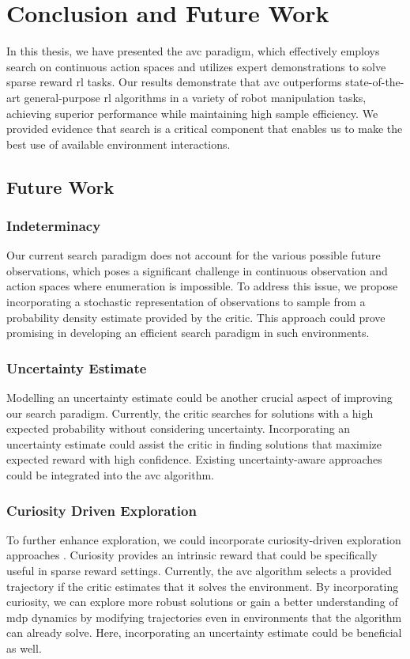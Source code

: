 
\chapter{Conclusion and Future Work}
\label{chapter:Conc_Fut}
In this thesis, we have presented the \ac{avc} paradigm, which effectively employs search on continuous action spaces and utilizes 
expert demonstrations to solve sparse reward \ac{rl} tasks. Our results demonstrate that \ac{avc} 
outperforms state-of-the-art general-purpose \ac{rl} algorithms in a variety of robot manipulation tasks, achieving superior performance 
while maintaining high sample efficiency. We provided evidence that search is a critical component that enables us to make the best use of available 
environment interactions.

\section{Future Work}
\subsection{Indeterminacy}
Our current search paradigm does not account for the various possible future observations, which poses a significant challenge in 
continuous observation and action spaces where enumeration is impossible. To address this issue, we propose incorporating a stochastic 
representation of observations to sample from a probability density estimate provided by the critic. 
This approach could prove promising in developing an efficient search paradigm in such environments.

\subsection{Uncertainty Estimate}
Modelling an uncertainty estimate could be another crucial aspect of improving our search paradigm. 
Currently, the critic searches for solutions with a high expected probability without considering uncertainty. 
Incorporating an uncertainty estimate could assist the critic in finding solutions that maximize expected reward with high confidence. 
Existing uncertainty-aware approaches \cite{gawlikowski2022survey,liu2022simple} 
could be integrated into the \ac{avc} algorithm.

\subsection{Curiosity Driven Exploration}
To further enhance exploration, we could incorporate curiosity-driven exploration approaches \cite{pathak2017curiositydriven}. 
Curiosity provides an intrinsic reward that could be specifically useful in sparse reward settings. 
Currently, the \ac{avc} algorithm selects a provided trajectory if the critic estimates that it solves the environment. By incorporating curiosity, 
we can explore more robust solutions or gain a better understanding of \ac{mdp} dynamics by modifying trajectories even in environments that the 
algorithm can already solve. Here, incorporating an uncertainty estimate could be beneficial as well.